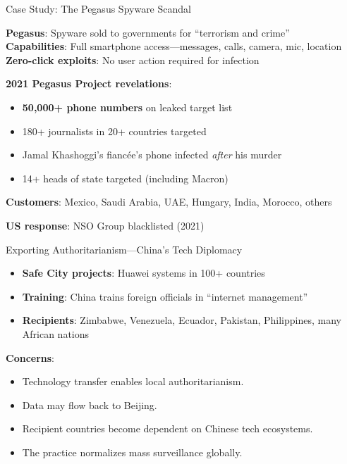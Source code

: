 ﻿\documentclass[aspectratio=169,11pt]{beamer}
\begin{document}
\begin{frame}{Case Study: The Pegasus Spyware Scandal}
\begin{casestudybox}
\small
\textbf{Pegasus}: Spyware sold to governments for ``terrorism and crime''\\
\textbf{Capabilities}: Full smartphone access---messages, calls, camera, mic, location\\
\textbf{Zero-click exploits}: No user action required for infection
\end{casestudybox}

\vspace{0.2em}
\textbf{2021 Pegasus Project revelations}:
\begin{itemize}
    \item \textbf{50,000+ phone numbers} on leaked target list
    \item 180+ journalists in 20+ countries targeted
    \item Jamal Khashoggi's fianc\'ee's phone infected \emph{after} his murder
    \item 14+ heads of state targeted (including Macron)
\end{itemize}

\textbf{Customers}: Mexico, Saudi Arabia, UAE, Hungary, India, Morocco, others

\textbf{US response}: NSO Group blacklisted (2021)
\end{frame}

\begin{frame}{Exporting Authoritarianism---China's Tech Diplomacy}
\begin{objectionbox}
\small
\begin{itemize}
    \item \textbf{Safe City projects}: Huawei systems in 100+ countries
    \item \textbf{Training}: China trains foreign officials in ``internet management''
    \item \textbf{Recipients}: Zimbabwe, Venezuela, Ecuador, Pakistan, Philippines, many African nations
\end{itemize}
\end{objectionbox}

\vspace{0.2em}
\textbf{Concerns}:
\begin{itemize}
    \item Technology transfer enables local authoritarianism.
    \item Data may flow back to Beijing.
    \item Recipient countries become dependent on Chinese tech ecosystems.
    \item The practice normalizes mass surveillance globally.
\end{itemize}
\end{frame}
\end{document}
